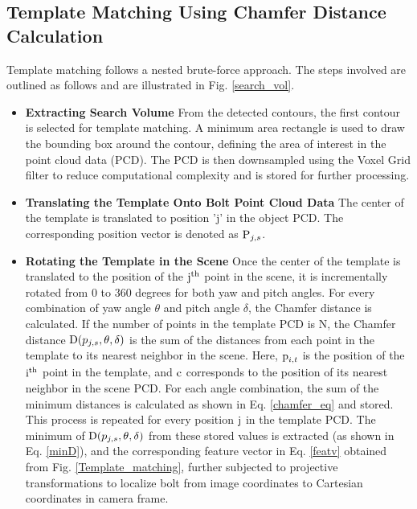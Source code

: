 \documentclass[conference]{IEEEtran}
\begin{document}
\subsection{\textnormal{\textbf{Template Matching Using Chamfer Distance Calculation}}}
Template matching follows a nested brute-force approach. The steps involved are outlined as follows and are illustrated in Fig. \ref{search_vol}.
\begin{itemize}
    \item \textbf{Extracting Search Volume }
    \newline From the detected contours, the first contour is selected for template matching. A minimum area rectangle is used to draw the bounding box around the contour, defining the area of interest in the point cloud data (PCD). The PCD is then downsampled using the Voxel Grid filter to reduce computational complexity and is stored for further processing.
    \item \textbf{Translating the Template Onto Bolt Point Cloud Data}
    \newline The center of the template is translated to position 'j' in the object PCD. The corresponding position vector is denoted as $\textnormal{P}_{j,s}$.
    \item \textbf{Rotating the Template in the Scene}
    \newline Once the center of the template is translated to the position of the $\textnormal{j}^{\text{th}}$ point in the scene, it is incrementally rotated from 0 to 360 degrees for both yaw and pitch angles. For every combination of yaw angle $\theta$ and pitch angle $\delta$, the Chamfer distance is calculated. If the number of points in the template PCD is N, the Chamfer distance $\textnormal{D}(p_{j,s},\theta,\delta)$ is the sum of the distances from each point in the template to its nearest neighbor in the scene. Here, $\textnormal{p}_{i,t}$ is the position of the $\textnormal{i}^{\text{th}}$ point in the template, and $\textnormal{c}$ corresponds to the position of its nearest neighbor in the scene PCD. For each angle combination, the sum of the minimum distances is calculated as shown in Eq. \ref{chamfer_eq} and stored. This process is repeated for every position $\textnormal{j}$ in the template PCD. The minimum of $\textnormal{D}(p_{j,s},\theta,\delta)$ from these stored values is extracted (as shown in Eq. \ref{minD}), and the corresponding feature vector in Eq. \ref{featv} obtained from Fig. \ref{Template_matching},  further subjected to projective transformations to localize bolt from image coordinates to Cartesian coordinates in camera frame.
\end{itemize}
\end{document}
